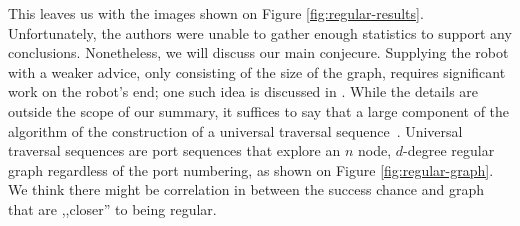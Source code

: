\documentclass{article}
\begin{document}
This leaves us with the images shown on Figure \ref{fig:regular-results}. Unfortunately, the authors were unable to gather enough statistics to support any conclusions. Nonetheless, we will discuss our main conjecure. Supplying the robot with a weaker advice, only consisting of the size of the graph, requires significant work on the robot's end; one such idea is discussed in \cite{aleliunas1979random}. While the details are outside the scope of our summary, it suffices to say that a large component of the algorithm of the construction of a universal traversal sequence~\cite{aleliunas1979random}. Universal traversal sequences are port sequences that explore an $n$ node, $d$-degree regular graph regardless of the port numbering, as shown on Figure \ref{fig:regular-graph}. We think there might be correlation in between the success chance and graph that are ,,closer'' to being regular.

\end{document}
